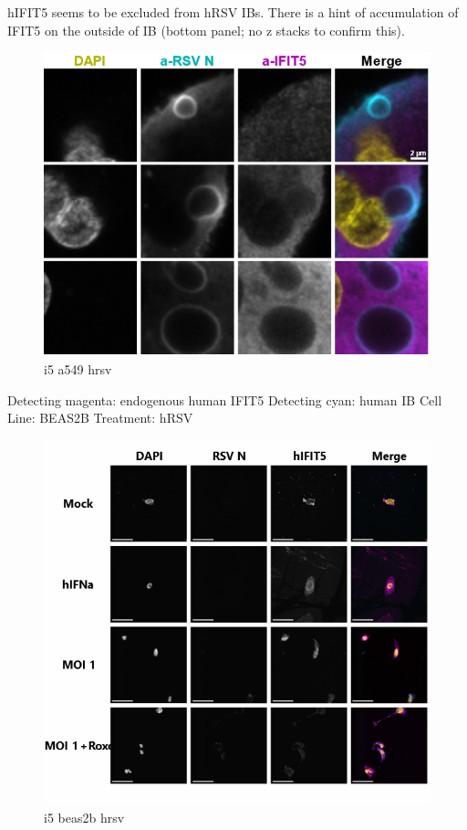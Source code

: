 hIFIT5 seems to be excluded from hRSV IBs. There is a hint of accumulation of IFIT5 on the outside of IB (bottom panel; no z stacks to confirm this). 

\begin{figure}
    \centering
    \includegraphics[width=1\linewidth]{08. Chapter 3/Figs/05. IFIT5/02. a549 hrsv.png}
    \caption[i5 a549 hrsv]{i5 a549 hrsv}
    \label{i5 a549 hrsv}
\end{figure}

Detecting magenta: endogenous human IFIT5 \newline
Detecting cyan: human IB \newline
Cell Line: BEAS2B \newline
Treatment: hRSV \newline

\begin{figure}
    \centering
    \includegraphics[width=1\linewidth]{08. Chapter 3/Figs/05. IFIT5/03. beas2b hrsv.png}
    \caption[i5 beas2b hrsv]{i5 beas2b hrsv}
    \label{i5 beas2b hrsv}
\end{figure}

